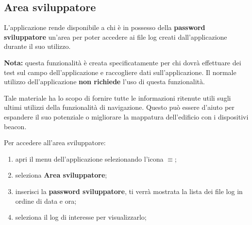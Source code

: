 \documentclass[../ClipsManualeUtente.tex]{subfiles}
\begin{document}
		
	\newpage
	\subsection{Area sviluppatore}
		L'applicazione rende disponibile a chi è in possesso della \textbf{password sviluppatore} un'area per poter accedere ai file log creati dall'applicazione durante il suo utilizzo.
		
		\begin{framed}
			\textbf{Nota:} questa funzionalità è creata specificatamente per chi dovrà effettuare dei test sul campo dell'applicazione e raccogliere dati sull'applicazione. Il normale utilizzo dell'applicazione \textbf{non richiede} l'uso di questa funzionalità.
		\end{framed}
		
		Tale materiale ha lo scopo di fornire tutte le informazioni ritenute utili sugli ultimi utilizzi della  funzionalità di navigazione. Questo può essere d'aiuto per espandere il suo potenziale o migliorare la mappatura dell'edificio con i dispositivi \gls{beacon}.
		
		Per accedere all'area sviluppatore:
		\begin{enumerate}
			\item apri il menu dell'applicazione selezionando l'icona $\equiv$;
			\item seleziona \textbf{Area sviluppatore}; %
			\item inserisci la \textbf{password sviluppatore}, ti verrà mostrata la lista dei file log in ordine di data e ora;
			\item seleziona il log di interesse per visualizzarlo; 
		\end{enumerate}
\end{document}
